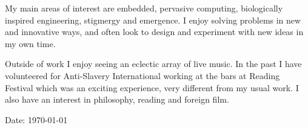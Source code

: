 \documentclass[overlapped,line,letterpaper]{res}
\begin{document}
\begin{resume}
My main areas of interest are embedded, pervasive computing, biologically 
inspired engineering, stigmergy and emergence. 
I enjoy solving problems in new and innovative ways, and often look to design and
experiment with new ideas in my own time.

Outside of work I enjoy seeing an eclectic array of live music. In the past I 
have volunteered for Anti-Slavery International working at the bars at Reading 
Festival which was an exciting experience, very different from my usual work.
I also have an interest in philosophy, reading and foreign film. 


\begin{center}
{\tiny \rm $ $Date: \today $ $ }
\end{center}

\end{resume}
\end{document}

